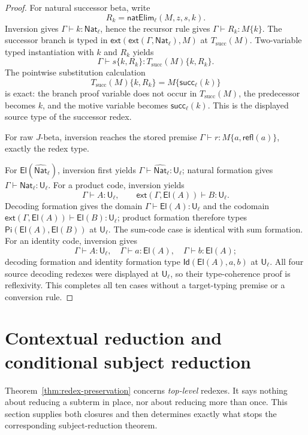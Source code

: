 \documentclass[10pt,reqno]{amsart}
\newcommand{\Ext}[2]{\mathsf{ext}(#1,#2)}
\newcommand{\Sort}{\mathsf{U}}
\newcommand{\PiTy}{\mathsf{Pi}}
\newcommand{\NatTy}{\mathsf{Nat}}
\newcommand{\Succ}{\mathsf{succ}}
\newcommand{\NatElim}{\mathsf{natElim}}
\newcommand{\CodeNat}{\widehat{\mathsf{Nat}}}
\newcommand{\El}{\mathsf{El}}
\newcommand{\IdTy}{\mathsf{Id}}
\newcommand{\Refl}{\mathsf{refl}}
\begin{document}
\begin{proof}
For natural successor beta, write
\[
 R_k=\NatElim_\ell(M,z,s,k).
\]
Inversion gives \(\Gamma\vdash k:\NatTy_\ell\), hence the recursor rule gives
\(\Gamma\vdash R_k:M\{k\}\).  The successor branch is typed in
\(\Ext{\Ext{\Gamma}{\NatTy_\ell}}{M}\) at
\(T_{\mathrm{succ}}(M)\).  Two-variable typed
instantiation with \(k\) and \(R_k\) yields
\[
 \Gamma\vdash s\{k,R_k\}:
     T_{\mathrm{succ}}(M)\{k,R_k\}.
\]
The pointwise substitution calculation
\[
 T_{\mathrm{succ}}(M)\{k,R_k\}=M\{\Succ_\ell(k)\}
\tag{5.10}\label{eq:nat-target-instantiation}
\]
is exact: the branch proof variable does not occur in
\(T_{\mathrm{succ}}(M)\), the predecessor becomes \(k\), and the motive
variable becomes \(\Succ_\ell(k)\).  This is the displayed source type of the
successor redex.

For raw \(J\)-beta, inversion reaches the stored premise
\(\Gamma\vdash r:M\{a,\Refl(a)\}\), exactly the redex type.

For \(\El(\CodeNat_\ell)\), inversion first yields
\(\Gamma\vdash\CodeNat_\ell:\Sort_\ell\); natural formation gives
\(\Gamma\vdash\NatTy_\ell:\Sort_\ell\).
For a product code, inversion yields
\[
\Gamma\vdash A:\Sort_\ell,\qquad
\Ext{\Gamma}{\El(A)}\vdash B:\Sort_\ell.
\]
Decoding formation gives the domain
\(\Gamma\vdash\El(A):\Sort_\ell\) and the codomain
\(\Ext{\Gamma}{\El(A)}\vdash\El(B):\Sort_\ell\); product formation therefore
types \(\PiTy(\El(A),\El(B))\) at \(\Sort_\ell\).
The sum-code case is identical with sum formation.  For an identity code,
inversion gives
\[
\Gamma\vdash A:\Sort_\ell,\quad
\Gamma\vdash a:\El(A),\quad
\Gamma\vdash b:\El(A);
\]
decoding formation and identity formation type
\(\IdTy(\El(A),a,b)\) at \(\Sort_\ell\).
All four source decoding redexes were displayed at \(\Sort_\ell\), so their
type-coherence proof is reflexivity.  This completes all ten cases without a
target-typing premise or a conversion rule.
\end{proof}

\section{Contextual reduction and conditional subject reduction}
\label{sec:reduction}

Theorem~\ref{thm:redex-preservation} concerns \emph{top-level} redexes.
It says nothing about reducing a subterm in place, nor about reducing more
than once.  This section supplies both closures and then determines exactly
what stops the corresponding subject-reduction theorem.
\end{document}
